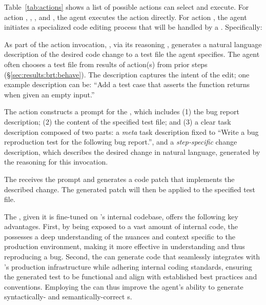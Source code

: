 

Table~\ref{tab:actions} shows a list of possible actions \tool can select and execute. For action \actioncat, \actioncodesearch, \actiontest, and \actionfinish, the agent executes the action directly.
For action \actionedit, the agent initiates a specialized code editing process that will be handled by a \codeeditingllm. Specifically:

As part of the \actionedit action invocation, \tool, via its reasoning \llm, generates a natural language description of the desired code change to a test file the agent specifies.
The agent often chooses a test file from results of \actioncodesearch action(s) from prior steps (\S\ref{sec:results:brt:behave}). 
The description captures the intent of the edit; one example description can be: ``Add a test case that asserts the function returns  when given an empty input.''

The action \actionedit constructs a prompt for the \codeeditingllm, which includes (1) the bug report description; (2) the content of the specified test file; and (3) a clear task description composed of two parts: a \textit{meta} task description fixed to ``Write a bug reproduction test for the following bug report.'', and a \textit{step-specific} change description, which describes the desired change in natural language, generated by the reasoning \llm for this \actionedit invocation.


The \codeeditingllm receives the prompt and generates a code patch that implements the described change. 
The generated patch will then be applied to the specified test file.

The \codeeditingllm, given it is fine-tuned on \google's internal codebase, offers the following key advantages. 
First, by being exposed to a vast amount of internal code, the \codeeditingllm possesses a deep understanding of the nuances and context specific to the production environment, making it more effective in understanding and thus reproducing a bug.
Second, the \codeeditingllm can generate code that seamlessly integrates with \google's production infrastructure while adhering internal coding standards, ensuring the generated test to be functional and align with established best practices and conventions.
Employing the \codeeditingllm can thus improve the agent's ability to generate syntactically- and semantically-correct \brt{}s.

